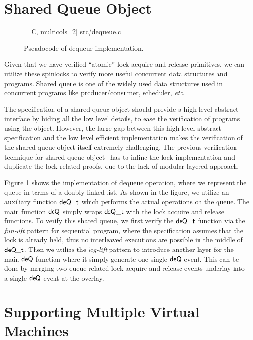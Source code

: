 \section{Shared Queue Object}

\begin{figure}[t]
 = C, multicols=2] {src/dequeue.c}
\caption{Pseudocode of dequeue implementation.}
\label{fig:exp:dequeue}
\end{figure}

Given that we have verified ``atomic'' lock acquire and release primitives,
we can utilize these spinlocks to verify more useful concurrent
data structures and programs. Shared queue is one of the widely used
data structures used in concurrent programs like producer/consumer,
scheduler, {\it etc}. 

The specification of a shared queue object should provide a high level abstract
interface by hiding all the low level details,
to ease the verification of programs using the object.
However, the large gap between this high level abstract specification
and the low level efficient implementation makes the verification of the shared queue object
itself extremely challenging.
The previous verification technique for shared queue object~\cite{lili16}
has to inline the lock implementation and duplicate the lock-related proofs, due
to the lack of modular layered approach.

Figure \ref{fig:exp:dequeue} shows the implementation of dequeue operation, where
we represent the queue in terms of a doubly linked list. 
As shown in the figure, we utilize an auxiliary function $\mathsf{deQ}\mathsf{\textcolor{black}{\_t}}$ which
performs the actual operations on the queue. The main function $\mathsf{deQ}$ simply
wraps $\mathsf{deQ}\mathsf{\textcolor{black}{\_t}}$ with the lock acquire and release functions.
To verify this shared queue, we first verify the $\mathsf{deQ}\mathsf{\textcolor{black}{\_t}}$ function
via the  \emph{fun-lift} pattern for sequential program, where the specification
assumes that the lock is already held, thus no interleaved executions are possible
in the middle of $\mathsf{deQ}\mathsf{\textcolor{black}{\_t}}$. Then we utilize 
the \emph{log-lift} pattern to introduce another layer for the main $\mathsf{deQ}$ function
where it simply generate one single $\mathsf{deQ}$ event. This can be done by merging two
queue-related lock acquire and release events underlay into a single $\mathsf{deQ}$ event
at the overlay. 


\section{Supporting Multiple Virtual Machines}

